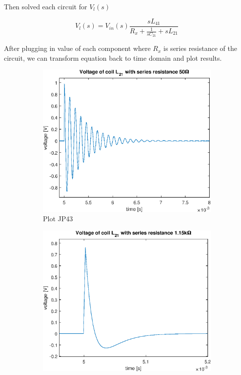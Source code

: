 \documentclass[notitlepage, a4paper, 11pt]{article}
\begin{document}
	Then solved each circuit for $V_l(s)$
	
	\begin{equation}
		V_l(s) = V_{in}(s)\dfrac{sL_{41}}{R_x + \frac{1}{sC_{21}} + sL_{21}}
	\end{equation}
	
	After plugging in value of each component where $R_x$ is series resistance of the circuit, we can transform equation back to time domain and plot results.
	
	\begin{figure}[H]
		\centering
		\begin{subfigure}{0.3 \textwidth}
			\includegraphics[width=\textwidth]{../Matlab/img/CircuitC3}
			\caption{Plot JP43}
		\end{subfigure}
		\hfill
		\begin{subfigure}{0.3 \textwidth}
			\includegraphics[width=\textwidth]{../Matlab/img/CircuitC2}

\end{subfigure}
\end{figure}
\end{document}
